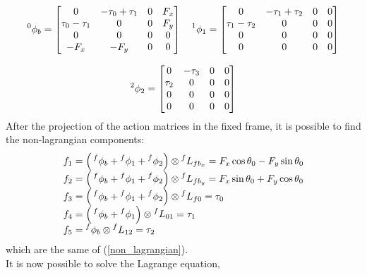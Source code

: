 \documentclass[a4paper,12pt,oneside]{report}
\begin{document}
\begin{equation}
  \begin{array}{c}
    \prescript{0}{}{\phi_b}=\begin{bmatrix}
      0&-\tau_0+\tau_1&0&F_x\\
      \tau_0-\tau_1&0&0&F_y\\
      0&0&0&0\\
      -F_x&-F_y&0&0
    \end{bmatrix} \quad
    \prescript{1}{}{\phi_1}=\begin{bmatrix}
      0&-\tau_1+\tau_2&0&0\\
      \tau_1-\tau_2&0&0&0\\
      0&0&0&0\\
      0&0&0&0
    \end{bmatrix}\\
    \\
    \prescript{2}{}{\phi_2}=\begin{bmatrix}
      0&-\tau_3&0&0\\
      \tau_2&0&0&0\\
      0&0&0&0\\
      0&0&0&0
    \end{bmatrix}
  \end{array}
\end{equation}
After the projection of the action matrices in the fixed frame, it is possible to find the non-lagrangian components:
\begin{equation}
  \begin{array}{l}
  f_1=\Big(\prescript{f}{}{\phi_b}+\prescript{f}{}{\phi_1}+\prescript{f}{}{\phi_2}\Big)\otimes \prescript{f}{}{L_{fb_x}}=F_x\cos{\theta_0}-F_y\sin{\theta_0}\\
  f_2=\Big(\prescript{f}{}{\phi_b}+\prescript{f}{}{\phi_1}+\prescript{f}{}{\phi_2}\Big)\otimes \prescript{f}{}{L_{fb_y}}=F_x\sin{\theta_0}+F_y\cos{\theta_0}\\
  f_3=\Big(\prescript{f}{}{\phi_b}+\prescript{f}{}{\phi_1}+\prescript{f}{}{\phi_2}\Big)\otimes \prescript{f}{}{L_{f0}}=\tau_0\\
  f_4=\Big(\prescript{f}{}{\phi_b}+\prescript{f}{}{\phi_1}\Big)\otimes \prescript{f}{}{L_{01}}=\tau_1\\
  f_5=\prescript{f}{}{\phi_b}\otimes \prescript{f}{}{L_{12}}=\tau_2
  \end{array}
\end{equation}
which are the same of (\ref{non_lagrangian}).\\
It is now possible to solve the Lagrange equation, 
\end{document}
